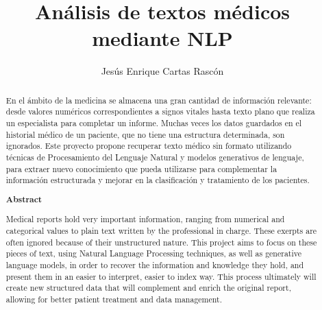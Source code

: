 \documentclass[12pt, a4paper, twoside]{report}
\title{Análisis de textos médicos \\mediante NLP}
\author{Jesús Enrique Cartas Rascón}
\begin{document}


\begin{abstract}
  En el ámbito de la medicina se almacena una gran cantidad de información relevante: desde valores numéricos correspondientes a signos vitales hasta texto plano que realiza un especialista para completar un informe. Muchas veces los datos guardados en el historial médico de un paciente, que no tiene una estructura determinada, son ignorados. Este proyecto propone recuperar texto médico sin formato utilizando técnicas de Procesamiento del Lenguaje Natural y modelos generativos de lenguaje, para extraer nuevo conocimiento que pueda utilizarse para complementar la información estructurada y mejorar en la clasificación y tratamiento de los pacientes.

\begin{center}
  \textbf{Abstract}
\end{center}


  Medical reports hold very important information, ranging from numerical and categorical values to plain text written by the professional in charge. These exerpts are often ignored because of their unstructured nature. This project aims to focus on these pieces of text, using Natural Language Processing techniques, as well as generative language models, in order to recover the information and knowledge they hold, and present them in an easier to interpret, easier to index way. This process ultimately will create new structured data that will complement and enrich the original report, allowing for better patient treatment and data management.

\end{abstract}


\tableofcontents
\listoffigures






% 
















\end{document}
